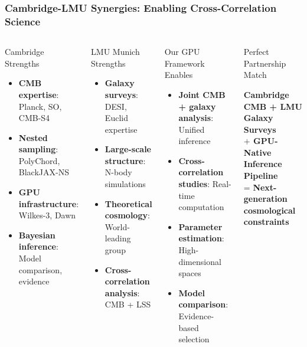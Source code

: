 \documentclass[aspectratio=169]{beamer}
\begin{document}
\begin{frame}
    \frametitle{Cambridge-LMU Synergies: Enabling Cross-Correlation Science}
    \begin{columns}
        \begin{block}{Cambridge Strengths}
            \begin{itemize}
                \item \textbf{CMB expertise}: Planck, SO, CMB-S4
                \item \textbf{Nested sampling}: PolyChord, BlackJAX-NS
                \item \textbf{GPU infrastructure}: Wilkes-3, Dawn
                \item \textbf{Bayesian inference}: Model comparison, evidence
            \end{itemize}
        \end{block}
        \begin{block}{LMU Munich Strengths}
            \begin{itemize}
                \item \textbf{Galaxy surveys}: DESI, Euclid expertise
                \item \textbf{Large-scale structure}: N-body simulations
                \item \textbf{Theoretical cosmology}: World-leading group
                \item \textbf{Cross-correlation analysis}: CMB + LSS
            \end{itemize}
        \end{block}
        \begin{block}{Our GPU Framework Enables}
            \begin{itemize}
                \item \textbf{Joint CMB + galaxy analysis}: Unified inference
                \item \textbf{Cross-correlation studies}: Real-time computation
                \item \textbf{Parameter estimation}: High-dimensional spaces
                \item \textbf{Model comparison}: Evidence-based selection
            \end{itemize}
        \end{block}
        \begin{block}{Perfect Partnership Match}
            \begin{center}
                \textbf{Cambridge CMB + LMU Galaxy Surveys}\\
                \textbf{$+$ GPU-Native Inference Pipeline}\\
                \vspace{5pt}
                = \textbf{Next-generation cosmological constraints}
            \end{center}
        \end{block}
    \end{columns}
\end{frame}
\end{document}
